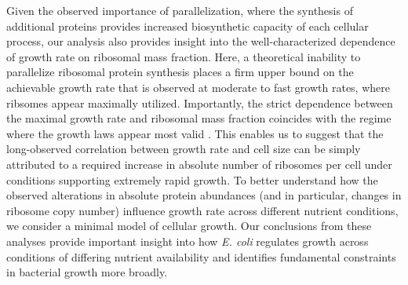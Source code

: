 Given the observed importance of parallelization, where the synthesis of
additional proteins provides increased biosynthetic capacity of each cellular
process, our analysis also provides insight into the well-characterized
dependence of growth rate on ribosomal mass fraction. Here, a theoretical
inability to parallelize ribosomal protein synthesis places a firm upper bound on the
achievable growth rate that is observed at moderate to fast growth
rates, where ribsomes appear maximally utilized. Importantly, the strict
dependence between the maximal growth rate and ribosomal mass fraction coincides
with the regime where the growth laws appear most valid \citep{amir2017,
scott2010}. This enables us to suggest that the long-observed correlation
between growth rate and cell size \citep{schaechter1958, si2017} can be simply
attributed to a required increase in absolute number of ribosomes per cell under
conditions supporting extremely rapid growth. To better understand how the
observed alterations in absolute protein abundances (and in particular, changes
in ribosome copy number) influence growth rate across different nutrient
conditions, we consider a minimal model of cellular growth. Our conclusions from
these analyses provide important insight into how \textit{E. coli} regulates
growth across conditions of differing nutrient availability and identifies
fundamental constraints in bacterial growth more broadly.





